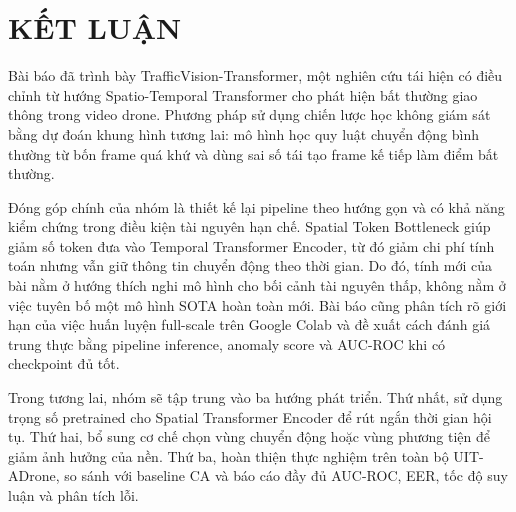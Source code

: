 \section{KẾT LUẬN}

Bài báo đã trình bày TrafficVision-Transformer, một nghiên cứu tái hiện có điều chỉnh từ hướng Spatio-Temporal Transformer cho phát hiện bất thường giao thông trong video drone. Phương pháp sử dụng chiến lược học không giám sát bằng dự đoán khung hình tương lai: mô hình học quy luật chuyển động bình thường từ bốn frame quá khứ và dùng sai số tái tạo frame kế tiếp làm điểm bất thường.

Đóng góp chính của nhóm là thiết kế lại pipeline theo hướng gọn và có khả năng kiểm chứng trong điều kiện tài nguyên hạn chế. Spatial Token Bottleneck giúp giảm số token đưa vào Temporal Transformer Encoder, từ đó giảm chi phí tính toán nhưng vẫn giữ thông tin chuyển động theo thời gian. Do đó, tính mới của bài nằm ở hướng thích nghi mô hình cho bối cảnh tài nguyên thấp, không nằm ở việc tuyên bố một mô hình SOTA hoàn toàn mới. Bài báo cũng phân tích rõ giới hạn của việc huấn luyện full-scale trên Google Colab và đề xuất cách đánh giá trung thực bằng pipeline inference, anomaly score và AUC-ROC khi có checkpoint đủ tốt.

Trong tương lai, nhóm sẽ tập trung vào ba hướng phát triển. Thứ nhất, sử dụng trọng số pretrained cho Spatial Transformer Encoder để rút ngắn thời gian hội tụ. Thứ hai, bổ sung cơ chế chọn vùng chuyển động hoặc vùng phương tiện để giảm ảnh hưởng của nền. Thứ ba, hoàn thiện thực nghiệm trên toàn bộ UIT-ADrone, so sánh với baseline CA và báo cáo đầy đủ AUC-ROC, EER, tốc độ suy luận và phân tích lỗi.

